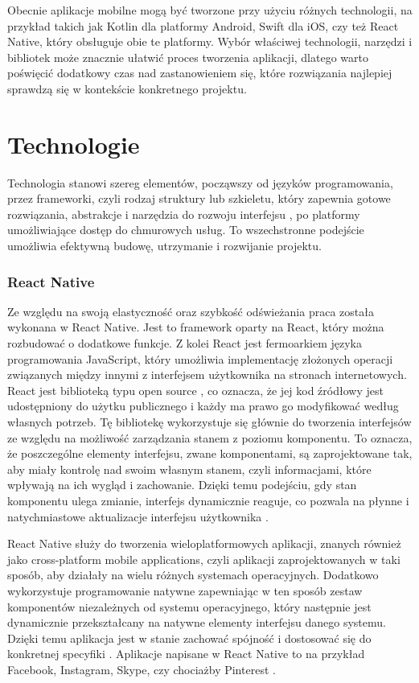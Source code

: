 Obecnie aplikacje mobilne mogą być tworzone przy użyciu różnych technologii, na
przykład takich jak Kotlin dla platformy Android, Swift dla iOS, czy też React Native, który
obsługuje obie te platformy. Wybór właściwej technologii, narzędzi i bibliotek może znacznie
ułatwić proces tworzenia aplikacji, dlatego warto poświęcić dodatkowy czas nad
zastanowieniem się, które rozwiązania najlepiej sprawdzą się w kontekście konkretnego
projektu.

\section{Technologie}
Technologia stanowi szereg elementów, począwszy od języków programowania, przez
frameworki, czyli rodzaj struktury lub szkieletu, który zapewnia gotowe rozwiązania, abstrakcje i narzędzia do rozwoju interfejsu \cite{framework}, po platformy umożliwiające dostęp do chmurowych usług. To wszechstronne podejście umożliwia efektywną budowę, utrzymanie i rozwijanie projektu.

\subsubsection*{\textbf{React Native}}
Ze względu na swoją elastyczność oraz szybkość odświeżania praca została wykonana
w React Native. Jest to framework oparty na React, który można rozbudować o dodatkowe
funkcje. Z kolei React jest fermoarkiem języka programowania JavaScript, który umożliwia
implementację złożonych operacji związanych między innymi z interfejsem użytkownika na
stronach internetowych. React jest biblioteką typu open source \cite{opensource}, co oznacza, że jej kod
źródłowy jest udostępniony do użytku publicznego i każdy ma prawo go modyfikować według
własnych potrzeb. Tę bibliotekę wykorzystuje się głównie do tworzenia interfejsów ze względu na możliwość zarządzania stanem z poziomu komponentu. To oznacza, że poszczególne
elementy interfejsu, zwane komponentami, są zaprojektowane tak, aby miały kontrolę nad
swoim własnym stanem, czyli informacjami, które wpływają na ich wygląd i zachowanie. Dzięki temu podejściu, gdy stan komponentu ulega zmianie, interfejs dynamicznie reaguje, co pozwala na płynne i natychmiastowe aktualizacje interfejsu użytkownika \cite{javascripteverywhere}.

React Native służy do tworzenia wieloplatformowych aplikacji, znanych również jako cross-platform mobile applications, czyli aplikacji zaprojektowanych w taki sposób, aby działały na wielu różnych systemach operacyjnych. Dodatkowo wykorzystuje programowanie natywne zapewniając w ten sposób zestaw komponentów niezależnych od systemu operacyjnego, który następnie jest dynamicznie przekształcany na natywne elementy interfejsu danego systemu. Dzięki temu aplikacja jest w stanie zachować spójność i dostosować się do konkretnej specyfiki \cite{reactnative}. Aplikacje napisane w React Native to na przykład Facebook, Instagram, Skype, czy chociażby Pinterest \cite{javascripteverywhere}.

